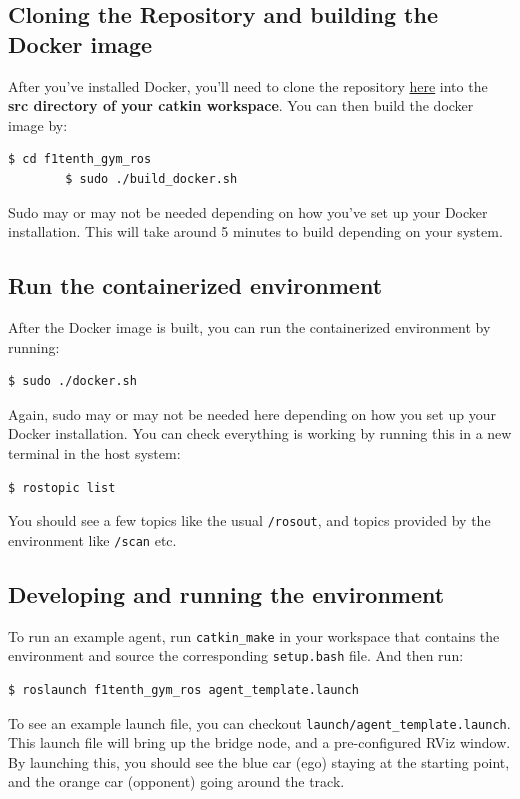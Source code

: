 \documentclass[letta4 paper]{article}
\numberwithin{equation}{section}
\newcommand{\0}{\mathbf{0}}
\begin{document}
	\subsection{Cloning the Repository and building the Docker image}
	After you've installed Docker, you'll need to clone the repository \href{https://github.com/f1tenth/f1tenth_gym_ros}{here} into the \textbf{src directory of your catkin workspace}. You can then build the docker image by:
	\begin{lstlisting}[language=bash]
		$ cd f1tenth_gym_ros
		$ sudo ./build_docker.sh
	\end{lstlisting}
	Sudo may or may not be needed depending on how you've set up your Docker installation. This will take around 5 minutes to build depending on your system.
	
	\subsection{Run the containerized environment}
	After the Docker image is built, you can run the containerized environment by running:
	\begin{lstlisting}[language=bash]
	$ sudo ./docker.sh
	\end{lstlisting}
	Again, sudo may or may not be needed here depending on how you set up your Docker installation. You can check everything is working by running this in a new terminal in the host system:
	\begin{lstlisting}[language=bash]
	$ rostopic list
	\end{lstlisting}
	You should see a few topics like the usual \texttt{/rosout}, and topics provided by the environment like \texttt{/scan} etc.
	
	\subsection{Developing and running the environment}
	To run an example agent, run \texttt{catkin\_make} in your workspace that contains the environment and source the corresponding \texttt{setup.bash} file. And then run:
	\begin{lstlisting}[language=bash]
	$ roslaunch f1tenth_gym_ros agent_template.launch
	\end{lstlisting}
	To see an example launch file, you can checkout \texttt{launch/agent\_template.launch}. This launch file will bring up the bridge node, and a pre-configured RViz window. By launching this, you should see the blue car (ego) staying at the starting point, and the orange car (opponent) going around the track.
	
\end{document}
